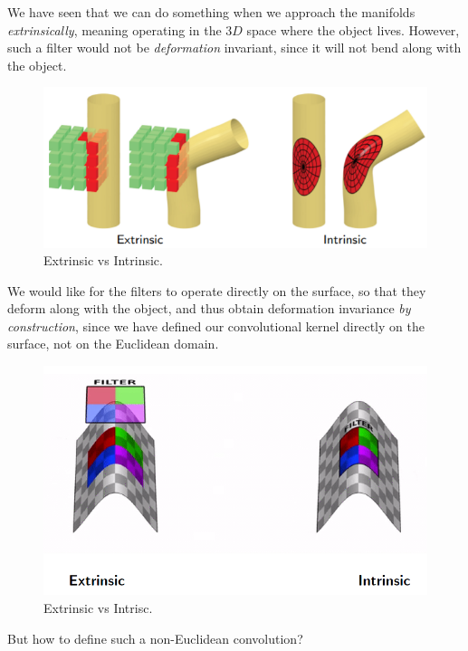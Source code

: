 
We have seen that we can do something when we approach the manifolds \emph{extrinsically}, meaning operating in the $3D$ space where the object lives.
However, such a filter would not be \emph{deformation} invariant, since it will not bend along with the object.

\begin{figure}[H]
    \centering
    \includegraphics[width=.7\textwidth]{figures/12/12_46.png}
    \caption{Extrinsic vs Intrinsic.}
\end{figure}

We would like for the filters to operate directly on the surface, so that they deform along with the object, and thus obtain deformation invariance \emph{by construction}, since we have defined our convolutional kernel directly on the 
surface, not on the Euclidean domain.

\begin{figure}[H]
    \centering
    \includegraphics[width=.7\textwidth]{figures/12/intrinsic.png}
    \caption{Extrinsic vs Intrisc.}
\end{figure}

But how to define such a non-Euclidean convolution?

